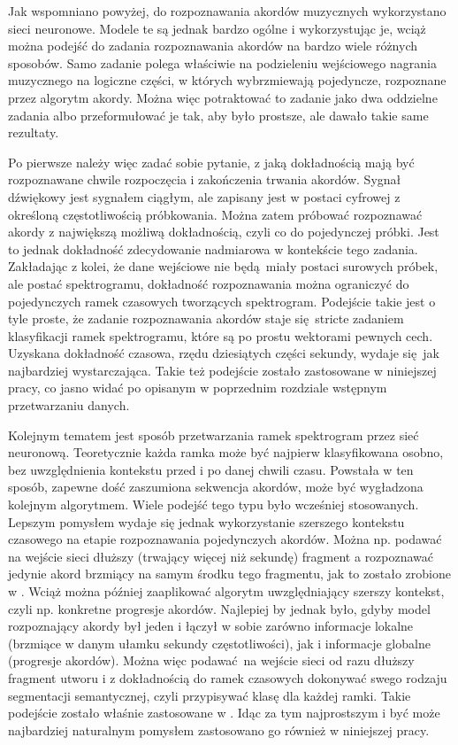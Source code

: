 Jak wspomniano powyżej, do rozpoznawania akordów muzycznych wykorzystano sieci neuronowe. Modele te
są jednak bardzo ogólne i wykorzystując je, wciąż można podejść do zadania rozpoznawania akordów na
bardzo wiele różnych sposobów. Samo zadanie polega właściwie na podzieleniu wejściowego nagrania
muzycznego na logiczne części, w których wybrzmiewają pojedyncze, rozpoznane przez algorytm akordy.
Można więc potraktować to zadanie jako dwa oddzielne zadania albo przeformułować je tak, aby było
prostsze, ale dawało takie same rezultaty. 

Po pierwsze należy więc zadać sobie pytanie, z jaką dokładnością mają być rozpoznawane chwile
rozpoczęcia i zakończenia trwania akordów. Sygnał dźwiękowy jest sygnałem ciągłym, ale zapisany jest
w postaci cyfrowej z określoną częstotliwością próbkowania. Można zatem próbować rozpoznawać akordy
z największą możliwą dokładnością, czyli co do pojedynczej próbki. Jest to jednak dokładność
zdecydowanie nadmiarowa w kontekście tego zadania. Zakładając z kolei, że dane wejściowe nie
będą miały postaci surowych próbek, ale postać spektrogramu, dokładność rozpoznawania można
ograniczyć do pojedynczych ramek czasowych tworzących spektrogram. Podejście takie jest o tyle
proste, że zadanie rozpoznawania akordów staje się stricte zadaniem klasyfikacji ramek spektrogramu,
które są po prostu wektorami pewnych cech. Uzyskana dokładność czasowa, rzędu dziesiątych części
sekundy, wydaje się jak najbardziej wystarczająca. Takie też podejście zostało zastosowane w
niniejszej pracy, co jasno widać po opisanym w poprzednim rozdziale wstępnym przetwarzaniu danych.

Kolejnym tematem jest sposób przetwarzania ramek spektrogram przez sieć neuronową. Teoretycznie
każda ramka może być najpierw klasyfikowana osobno, bez uwzględnienia kontekstu przed i po danej
chwili czasu. Powstała w ten sposób, zapewne dość zaszumiona sekwencja akordów, może być wygładzona
kolejnym algorytmem. Wiele podejść tego typu było wcześniej stosowanych. Lepszym pomysłem wydaje się
jednak wykorzystanie szerszego kontekstu czasowego na etapie rozpoznawania pojedynczych akordów.
Można np.  podawać na wejście sieci dłuższy (trwający więcej niż sekundę) fragment a rozpoznawać
jedynie akord brzmiący na samym środku tego fragmentu, jak to zostało zrobione w
\cite{korzeniowski_fully_2016}.  Wciąż można później zaaplikować algorytm uwzględniający szerszy
kontekst, czyli np. konkretne progresje akordów. Najlepiej by jednak było, gdyby model rozpoznający
akordy był jeden i łączył w sobie zarówno informacje lokalne (brzmiące w danym ułamku sekundy
częstotliwości), jak i informacje globalne (progresje akordów). Można więc podawać na wejście sieci
od razu dłuższy fragment utworu i z dokładnością do ramek czasowych dokonywać swego rodzaju
segmentacji semantycznej, czyli przypisywać klasę dla każdej ramki. Takie podejście zostało właśnie
zastosowane w \cite{park_bi-directional_2019}. Idąc za tym najprostszym i być może najbardziej
naturalnym pomysłem zastosowano go również w niniejszej pracy. 




